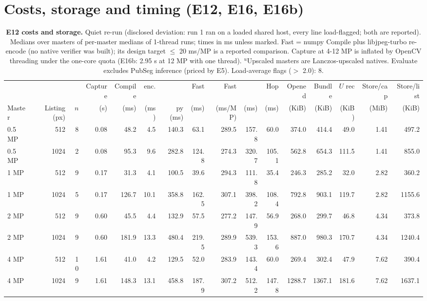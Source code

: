\documentclass[10pt]{article}
\begin{document}
\section{Costs, storage and timing (E12, E16, E16b)}
\label{sec:e12}
\begin{table}[!htbp]
\centering
\caption{\textbf{E12 costs and storage.} Quiet re-run (disclosed deviation: run 1 ran on a loaded shared host, every line load-flagged; both are reported). Medians over masters of per-master medians of 1-thread runs; times in ms unless marked. Fast = numpy Compile plus libjpeg-turbo re-encode (no native verifier was built); its design target $\le$ 20 ms/MP is a reported comparison. Capture at 4-12 MP is inflated by OpenCV threading under the one-core quota (E16b: 2.95 s at 12 MP with one thread). $^{u}$Upscaled masters are Lanczos-upscaled natives. Evaluate excludes PubSeg inference (priced by E5). Load-average flags ($>$ 2.0): 8.}
\label{tab:costs}
\tabsmall
\setlength{\tabcolsep}{2.6pt}
\begin{tabular}{@{}lrrrrrrrrrrrrrrr@{}}
\toprule
& & & Capture & Compile & \Ezero{} enc. & \VerifyE{} & Fast & Fast & \Evaluate{} & Hop & Opened & Bundle & $U$ rec & Store/cap & Store/list \\
Master & Listing (px) & $n$ & (s) & (ms) & (ms) & py (ms) & (ms) & (ms/MP) & (ms) & (ms) & (KiB) & (KiB) & (KiB) & (MiB) & (KiB) \\
\midrule
0.5 MP & 512 & 8 & 0.08 & 48.2 & 4.5 & 140.3 & 63.1 & 289.5 & 157.8 & 60.0 & 374.0 & 414.4 & 49.0 & 1.41 & 497.2 \\
0.5 MP & 1024 & 2 & 0.08 & 95.3 & 9.6 & 282.8 & 124.8 & 274.3 & 320.7 & 105.1 & 562.8 & 654.3 & 111.5 & 1.41 & 855.0 \\
1 MP & 512 & 9 & 0.17 & 31.3 & 4.1 & 100.5 & 39.6 & 294.3 & 111.8 & 35.4 & 246.3 & 285.2 & 32.0 & 2.82 & 360.2 \\
1 MP & 1024 & 5 & 0.17 & 126.7 & 10.1 & 358.8 & 162.5 & 307.1 & 398.2 & 108.4 & 792.8 & 903.1 & 119.7 & 2.82 & 1155.6 \\
2 MP & 512 & 9 & 0.60 & 45.5 & 4.4 & 132.9 & 57.5 & 277.2 & 147.9 & 56.9 & 268.0 & 299.7 & 46.8 & 4.34 & 373.8 \\
2 MP & 1024 & 9 & 0.60 & 181.9 & 13.3 & 480.4 & 219.5 & 289.9 & 539.3 & 153.6 & 887.0 & 980.3 & 170.7 & 4.34 & 1240.4 \\
4 MP & 512 & 10 & 1.61 & 41.0 & 4.2 & 129.5 & 52.0 & 283.9 & 143.4 & 60.0 & 269.4 & 302.4 & 47.9 & 7.62 & 390.4 \\
4 MP & 1024 & 9 & 1.61 & 148.3 & 13.1 & 458.8 & 187.9 & 307.2 & 512.2 & 147.8 & 1288.7 & 1367.1 & 181.6 & 7.62 & 1637.1 \\

\end{tabular}
\end{table}
\end{document}
